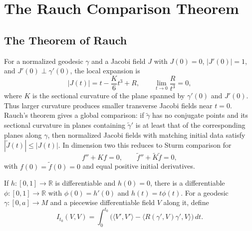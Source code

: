 \chapter{The Rauch Comparison Theorem}
\label{chap:dc-rauch-comparison-theorem}

\section{The Theorem of Rauch}

For a normalized geodesic $\gamma$ and a Jacobi field $J$ with
$J(0)=0$, $|J'(0)|=1$, and $J'(0)\perp\gamma'(0)$, the local expansion is
\[
 |J(t)|=t-\frac{K}{6}t^3+R,\qquad \lim_{t\to0}\frac{R}{t^3}=0,
\]
where $K$ is the sectional curvature of the plane spanned by $\gamma'(0)$ and
$J'(0)$. Thus larger curvature produces smaller transverse Jacobi fields near
$t=0$. Rauch's theorem gives a global comparison: if $\tilde\gamma$ has no
conjugate points and its sectional curvature in planes containing
$\tilde\gamma'$ is at least that of the corresponding planes along $\gamma$,
then normalized Jacobi fields with matching initial data satisfy
$|\tilde J(t)|\leq |J(t)|$. In dimension two this reduces to Sturm comparison for
\[
 f''+Kf=0,\qquad \tilde f''+\widetilde K\tilde f=0,
\]
with $f(0)=\tilde f(0)=0$ and equal positive initial derivatives.

\begin{lemma}
  \label{lem:dc-ch10-2-1}
  If $h:[0,1]\to\mathbb R$ is differentiable and $h(0)=0$, there is a differentiable
  $\phi:[0,1]\to\mathbb R$ with $\phi(0)=h'(0)$ and $h(t)=t\phi(t)$. For a geodesic
  $\gamma:[0,a]\to M$ and a piecewise differentiable field $V$ along it, define
  \[
  I_{t_0}(V,V)=\int_0^{t_0}\bigl(\langle V',V'\rangle-
  \langle R(\gamma',V)\gamma',V\rangle\bigr)\,dt.
  \]
\end{lemma}

